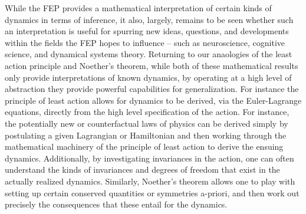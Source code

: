 While the FEP provides a mathematical interpretation of certain kinds of dynamics in terms of inference, it also, largely, remains to be seen whether such an interpretation is useful for spurring new ideas, questions, and developments within the fields the FEP hopes to influence -- such as neuroscience, cognitive science, and dynamical systems theory. Returning to our anaologies of the least action principle and Noether's theorem, while both of these mathematical results only provide interpretations of known dynamics, by operating at a high level of abstraction they provide powerful capabilities for generalization. For instance the principle of least action allows for dynamics to be derived, via the Euler-Lagrange equations, directly from the high level specification of the action. For instance, the potentially new or counterfactual laws of physics can be derived simply by postulating a given Lagrangian or Hamiltonian and then working through the mathematical machinery of the principle of least action to derive the ensuing dynamics. Additionally, by investigating invariances in the action, one can often understand the kinds of invariances and degrees of freedom that exist in the actually realized dynamics. Similarly, Noether's theorem allows one to play with setting up certain conserved quantities or symmetries a-priori, and then work out precisely the consequences that these entail for the dynamics. 

